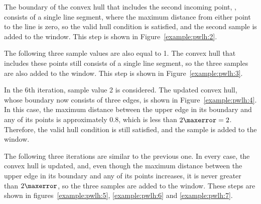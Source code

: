 \vspace{+5pt}


\newcommand{\widthh}{\textit{distance}}
The boundary of the convex hull that includes the second incoming point, , consists of a single line segment, where the maximum distance from either point to the line is zero, so the valid hull condition is satisfied, and the second sample is added to the window. This step is shown in Figure~\ref{example:pwlh:2}.




\clearpage


The following three sample values are also equal to 1. The convex hull that includes these points still consists of a single line segment, so the three samples are also added to the window. This step is shown in Figure~\ref{example:pwlh:3}.




In the 6th iteration, sample value 2 is considered. The updated convex hull, whose boundary now consists of three edges, is shown in Figure~\ref{example:pwlh:4}. In this case, the maximum distance between the upper edge in its boundary and any of its points is approximately $0.8$, which is less than $2\maxerror=2$. Therefore, the valid hull condition is still satisfied, and the sample is added to the window.


\vspace{+5pt}


\clearpage


The following three iterations are similar to the previous one. In every case, the convex hull is updated, and, even though the maximum distance between the upper edge in its boundary and any of its points increases, it is never greater than $2\maxerror$, so the three samples are added to the window. These steps are shown in figures~\ref{example:pwlh:5}, \ref{example:pwlh:6} and \ref{example:pwlh:7}. 

\vspace{+5pt}

\vspace{-15pt}

\vspace{-15pt}

